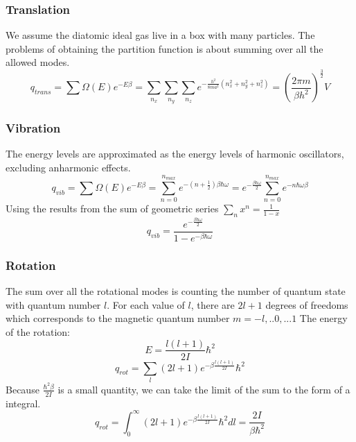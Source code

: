 \documentclass[12pt, oneside]{article}   	%
\begin{document}
\subsubsection*{Translation}
We assume the diatomic ideal gas live in a box with many particles. The problems of obtaining the partition function is about summing over all the allowed modes.
$$q_{trans} = \sum \Omega(E) e^{-E \beta} = \sum_{n_x} \sum_{n_y} \sum_{n_z} e^{- \frac{h^2}{8 m a^2} (n_x^2 + n_y^2 + n_z^2)} = (\frac{2 \pi m}{\beta h^2})^{\frac{3}{2}} V $$
\subsubsection*{Vibration} 
The energy levels are approximated as the energy levels of harmonic oscillators, excluding anharmonic effects. 
$$q_{vib} = \sum \Omega(E) e^{-E \beta} = \sum_{n=0}^{n_{max}} e^{- (n+\frac{1}{2} ) \beta \hbar \omega} = e^{-\frac{\beta \hbar \omega}{2}} \sum_{n=0}^{n_{max}} e^{-n \hbar \omega \beta}$$
Using the results from the sum of geometric series $\sum_{n} x^n  = \frac{1}{1 -x }$
$$q_{vib} = \frac{  e^{- \frac{\beta \hbar \omega}{2}} } {1 - e^{- \beta \hbar \omega}} $$
\subsubsection*{Rotation}
The sum over all the rotational modes is counting the number of quantum state with quantum number $l$. For each value of $l$, there are $2l + 1$ degrees of freedoms which corresponds to the magnetic quantum number $m = -l,..0,...1$
The energy of the rotation:
$$E = \frac{l(l+1)}{2 I} \hbar^2$$
$$q_{rot} = \sum_l (2l + 1) e^{- \beta \frac{l (l+1)}{2I}} \hbar^2$$
Because $\frac{\hbar^2 \beta}{2I}$ is a small quantity, we can take the limit of the sum to the form of a integral. 
$$q_{rot} = \int_0^{\infty} (2l + 1) e^{- \beta \frac{l(l+1)}{2I} }\hbar^2 dl = \frac{2I }{\beta \hbar^2}$$
\end{document}
